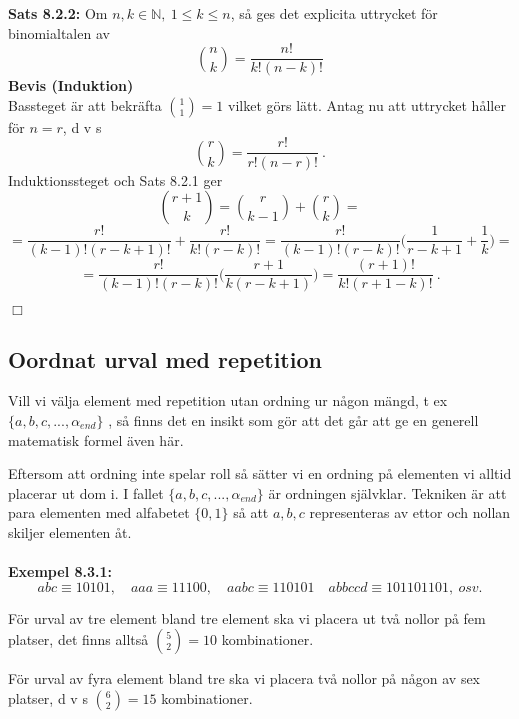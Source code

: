 \documentclass{article}
\begin{document}
\noindent
\textbf{Sats 8.2.2:} Om $n,k\in\mathbb{N}, \ 1\leq k\leq n$, så ges det explicita uttrycket för binomialtalen av
$$
{n \choose k}=\frac{n!}{k!(n-k)!}
$$
\textbf{Bevis (Induktion)}\\
Bassteget är att bekräfta ${1 \choose 1}=1$ vilket görs lätt. Antag nu att uttrycket håller för $n=r$, d v s
$$
{r \choose k}=\frac{r!}{r!(n-r)!} \ .
$$
Induktionssteget och Sats 8.2.1 ger
$$
{r+1 \choose k}={r \choose k-1}+{r \choose k}=
$$
$$
=\frac{r!}{(k-1)!(r-k+1)!}+\frac{r!}{k!(r-k)!}=\frac{r!}{(k-1)!(r-k)!}\Big(\frac{1}{r-k+1}+\frac{1}{k}\Big)=
$$
$$
=\frac{r!}{(k-1)!(r-k)!}\Big(\frac{r+1}{k(r-k+1)}\Big)=\frac{(r+1)!}{k!(r+1-k)!} \ .
$$
\begin{flushright}
$\Box$
\end{flushright}
\subsection{Oordnat urval med repetition}
Vill vi välja element med repetition utan ordning ur någon mängd, t ex $\{a,b,c,...,\alpha_{end}\}$ , så finns det en insikt som gör att det går att ge en generell matematisk formel även här.

Eftersom att ordning inte spelar roll så sätter vi en ordning på elementen vi alltid placerar ut dom i. I fallet $\{a,b,c,...,\alpha_{end}\}$ är ordningen självklar. Tekniken är att para elementen med alfabetet $\{0,1\}$ så att $a,b,c$ representeras av ettor och nollan skiljer elementen åt.\\ \\
\textbf{Exempel 8.3.1:}
$$
abc\equiv 10101, \quad aaa\equiv 11100, \quad aabc\equiv 110101 \quad abbccd \equiv 101101101, \ osv. 
$$

För urval av tre element bland tre element ska vi placera ut två nollor på fem platser, det finns alltså ${5 \choose 2}=10$ kombinationer.

För urval av fyra element bland tre ska vi placera två nollor på någon av sex platser, d v s ${6 \choose 2}=15$ kombinationer.
\end{document}
